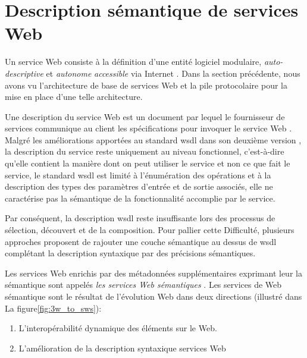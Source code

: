 
\section{Description sémantique de services Web}
\label{sec:ws-description}

Un service Web consiste à la définition d'une entité logiciel
modulaire, \textit{auto-descriptive} et \textit{autonome}
\textit{accessible} via Internet \cite{curbera2001web}. Dans la
section précédente, nous avons vu l'architecture de base de services
Web et la pile protocolaire pour la mise en place d'une telle
architecture.



Une description du service Web est un document par lequel le
fournisseur de services communique au client les spécifications pour
invoquer le service Web \cite{lopez2008selection}. Malgré les
améliorations apportées au standard \acrshort{wsdl} dans son deuxième
version \cite{chinnici2007web}, la description du service reste
uniquement au niveau fonctionnel, c'est-à-dire qu'elle contient la
manière dont on peut utiliser le service et non ce que fait le
service, le standard \acrshort{wsdl} est limité à l'énumération des
opérations et à la description des types des paramètres d'entrée et de
sortie associés, elle ne caractérise pas la sémantique de la
fonctionnalité accomplie par le service.

Par conséquent, la description \acrshort{wsdl} reste insuffisante lors
des processus de sélection, découvert et de la composition. Pour
pallier cette Difficulté, plusieurs approches
\cite{sivashanmugam2003adding,mcilraith2001semantic,
  mcilraith2003bringing, fensel2002web} proposent de rajouter une
couche sémantique au dessus de \acrshort{wsdl} complétant la description
syntaxique par des précisions sémantiques.


Les services Web enrichis par des métadonnées supplémentaires
exprimant leur la sémantique sont appelés \textit{les services Web
sémantiques} \cite{fensel2002semantic, mcilraith2001semantic}. Les
services de Web sémantique sont le résultat de l'évolution Web dans
deux directions \cite{bartalos2011effective} (illustré dans La
figure\ref{fig:3w_to_sws}):

\begin{enumerate}
  \item L'interopérabilité dynamique des éléments sur le Web.
  \item L'amélioration de la description syntaxique services Web
\end{enumerate}

